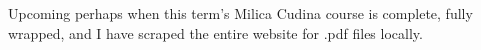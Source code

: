 Upcoming perhaps when this term's Milica Cudina course is complete, fully wrapped, and I have scraped the entire website for .pdf files locally.